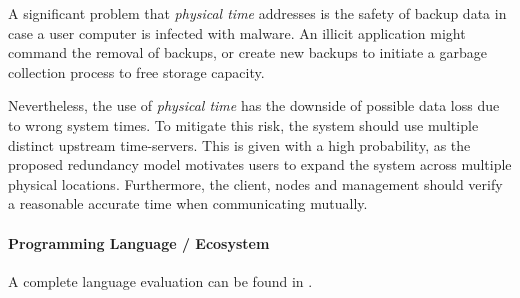 A significant problem that \emph{physical time} addresses is the safety of backup data in case a user computer is infected with malware. An illicit application might command the removal of backups, or create new backups to initiate a garbage collection process to free storage capacity.

Nevertheless, the use of \emph{physical time} has the downside of possible data loss due to wrong system times. To mitigate this risk, the system should use multiple distinct upstream time-servers. This is given with a high probability, as the proposed redundancy model motivates users to expand the system across multiple physical locations. Furthermore, the client, \glspl{node} and \gls{management} should verify a reasonable accurate time when communicating mutually.

\paragraph{Programming Language / Ecosystem}
A complete language evaluation can be found in .

